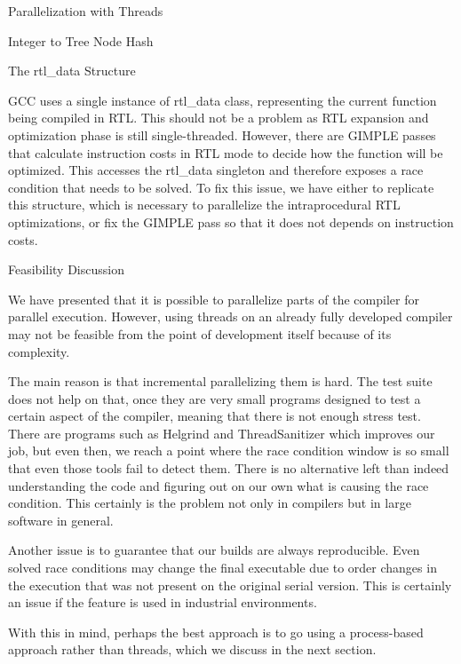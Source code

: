 \begin{section}{Parallelization with Threads}
\begin{subsection}{Integer to Tree Node Hash}
\end{subsection}

\begin{subsection}{The rtl\_data Structure}

GCC uses a single instance of rtl\_data class, representing the current
function being compiled in RTL. This should not be a problem as RTL expansion
and optimization phase is still single-threaded. However, there are GIMPLE
passes that calculate instruction costs in RTL mode to decide how the function
will be optimized. This accesses the rtl\_data singleton and therefore exposes
a race condition that needs to be solved. To fix this issue, we have either to
replicate this structure, which is necessary to parallelize the intraprocedural
RTL optimizations, or fix the GIMPLE pass so that it does not depends on
instruction costs. 

\end{subsection}

\begin{subsection}{Feasibility Discussion}

We have presented that it is possible to parallelize parts of the compiler for
parallel execution. However, using threads on an already fully developed
compiler may not be feasible from the point of development itself because of
its complexity.

The main reason is that incremental parallelizing them is hard. The test suite
does not help on that, once they are very small programs designed to test a
certain aspect of the compiler, meaning that there is not enough stress test.
There are programs such as Helgrind and ThreadSanitizer which improves our job,
but even then, we reach a point where the race condition window is so small
that even those tools fail to detect them. There is no alternative left than
indeed understanding the code and figuring out on our own what is causing the
race condition. This certainly is the problem not only in compilers but in
large software in general.

Another issue is to guarantee that our builds are always reproducible.
Even solved race conditions may change the final executable due to order
changes in the execution that was not present on the original serial version.
This is certainly an issue if the feature is used in industrial environments.

With this in mind, perhaps the best approach is to go using a process-based
approach rather than threads, which we discuss in the next section.

\end{subsection}

\end{section}

